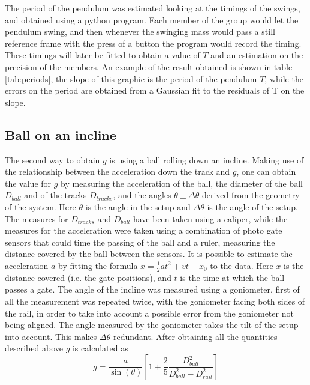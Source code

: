 \documentclass[a4paper,%
               aps,%
               prl,%
               amsfonts,%
               amssymb,%
               amsmath,%
               nobibnotes,%
               twocolumn, %
               twoside,%
               balancelastpage,%
               eqsecnum] %
               {revtex4-1}
\begin{document}
The period of the pendulum was estimated looking at the timings of the swings, and obtained using a python program. Each member of the group would let the pendulum swing, and then whenever the swinging mass would pass a still reference frame with the press of a button the program would record the timing. These timings will later be fitted to obtain a value of $T$ and an estimation on the precision of the members. An example of the result obtained is shown in table \ref{tab:periods}, the slope of this graphic is the period of the pendulum $T$, while the errors on the period are obtained from a Gaussian fit to the residuals of T on the slope.


\subsection{Ball on an incline}

The second way to obtain $g$ is using a ball rolling down an incline.
Making use of the relationship between the acceleration down the track and $g$, one can obtain the value for $g$ by measuring the acceleration of the ball, the diameter of the ball $D_{ball}$ and of the tracks $D_{tracks}$, and the angles $\theta \pm \Delta\theta$ derived from the geometry of the system.
Here $\theta$ is the angle in the setup and $\Delta\theta$ is the angle of the setup.
The measures for $D_{tracks}$ and $D_{ball}$ have been taken using a caliper, while the measures for the acceleration were taken using a combination of photo gate sensors that could time the passing of the ball and a ruler, measuring the distance covered by the ball between the sensors.
It is possible to estimate the acceleration $a$ by fitting the formula $x = \frac{1}{2} a t^2 + v t + x_0$ to the data.
Here $x$ is the distance covered (i.e. the gate positions), and $t$ is the time at which the ball passes a gate.
The angle of the incline was measured using a goniometer, first of all the measurement was repeated twice, with the goniometer facing both sides of the rail, in order to take into account a possible error from the goniometer not being aligned.
The angle measured by the goniometer takes the tilt of the setup into account. This makes $\Delta\theta$ redundant.
After obtaining all the quantities described above $g$ is calculated as
$$g=\frac{a}{\sin{(\theta)}}[1+\frac{2}{5}\frac{D_{ball}^2}{D_{ball}^2-D_{rail}^2}]$$
\end{document}

